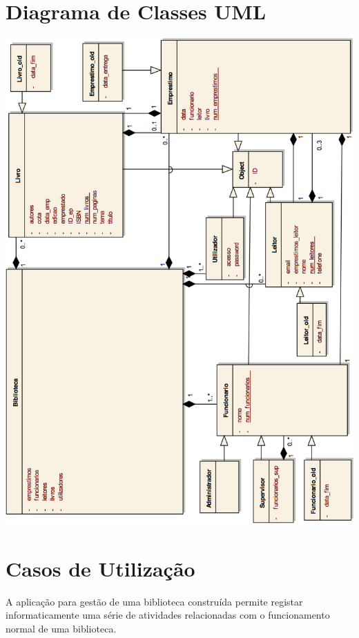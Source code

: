 \documentclass[12pt,a4paper,reqno]{report}
\numberwithin{figure}{section}
\numberwithin{equation}{section}
\begin{document}
\chapter{Diagrama de Classes UML}

\begin{center}

\includegraphics[width=14.4cm]{UML.jpg}

\end{center}

\chapter{Casos de Utilização}

A aplicação para gestão de uma biblioteca construída permite registar informaticamente uma série de atividades relacionadas com o funcionamento normal de uma biblioteca.
\end{document}
